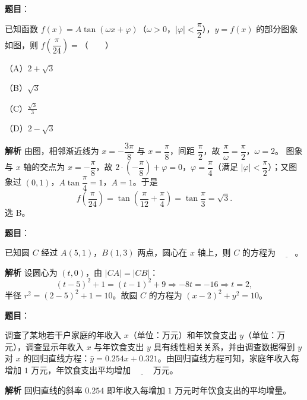 \begin{answer}

\textbf{题目}：

已知函数 $f(x)=A\tan(\omega x+\varphi)$（$\omega>0$，$|\varphi|<\dfrac\pi2$），$y=f(x)$ 的部分图象如图，则 $f\left(\dfrac\pi{24}\right)=$\mbox{（　　）}

（A）$2+\sqrt3$

（B）$\sqrt3$

（C）$\frac{\sqrt3}3$

（D）$2-\sqrt3$
\nopagebreak[4]
\begin{center}\end{center}
\nopagebreak[4]
\textbf{解析}
由图，相邻渐近线为 $x=-\dfrac{3\pi}8$ 与 $x=\dfrac\pi8$，间距 $\dfrac\pi2$，故 $\dfrac\pi\omega=\dfrac\pi2$，$\omega=2$。
图象与 $x$ 轴的交点为 $x=-\dfrac\pi8$，故 $2\cdot\left(-\dfrac\pi8\right)+\varphi=0$，$\varphi=\dfrac\pi4$（满足 $|\varphi|<\dfrac\pi2$）；又图象过 $(0,1)$，$A\tan\dfrac\pi4=1$，$A=1$。于是
\nopagebreak[4]
\[f\left(\frac\pi{24}\right)=\tan\left(\frac\pi{12}+\frac\pi4\right)=\tan\frac\pi3=\sqrt3.\]
选 B。


\end{answer}
\begin{answer}

\textbf{题目}：

已知圆 $C$ 经过 $A(5,1)$，$B(1,3)$ 两点，圆心在 $x$ 轴上，则 $C$ 的方程为 $\underline{\qquad}$。

\textbf{解析}
设圆心为 $(t,0)$，由 $|CA|=|CB|$：
\nopagebreak[4]
\[(t-5)^2+1=(t-1)^2+9\Longrightarrow-8t=-16\Longrightarrow t=2,\]
半径 $r^2=(2-5)^2+1=10$。故圆 $C$ 的方程为 $(x-2)^2+y^2=10$。


\end{answer}
\begin{answer}

\textbf{题目}：

调查了某地若干户家庭的年收入 $x$（单位：万元）和年饮食支出 $y$（单位：万元），调查显示年收入 $x$ 与年饮食支出 $y$ 具有线性相关关系，并由调查数据得到 $y$ 对 $x$ 的回归直线方程：$\hat y=0.254x+0.321$。由回归直线方程可知，家庭年收入每增加 $1$ 万元，年饮食支出平均增加 $\underline{\qquad}$ 万元。

\textbf{解析}
回归直线的斜率 $0.254$ 即年收入每增加 $1$ 万元时年饮食支出的平均增量。


\end{answer}
